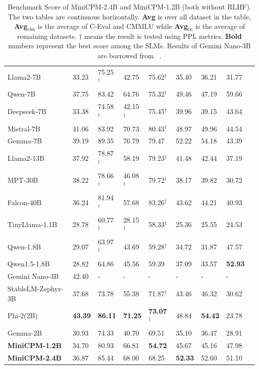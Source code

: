 \documentclass[dvipsnames]{article}
\begin{document}
\begin{table}[!htbp]
{\begin{tabular}{lm{1.2cm}m{1.2cm}m{1.2cm}m{1.7cm}m{1.2cm}m{1.2cm}m{1.2cm}m{1.2cm}}
\midrule
Llama2-7B  & 33.23 & 75.25$^{\dag}$ & 42.75 & 75.62$^{\dag}$ & 35.40 & 36.21 & 31.77 \\
Qwen-7B  & 37.75 & 83.42 & 64.76 & 75.32$^{\dag}$ & 49.46 & 47.19 & 59.66 \\
Deepseek-7B  & 33.38 & 74.58$^{\dag}$ & 42.15$^{\dag}$ & 75.45$^{\dag}$ & 39.96 & 39.15 & 43.64 \\
Mistral-7B & 41.06 & 83.92 & 70.73 & 80.43$^{\dag}$ & 48.97 & 49.96 & 44.54 \\
Gemma-7B  & 39.19 & 89.35 & 76.79 & 79.47 & 52.22 & 54.18 & 43.39 \\
\midrule
Llama2-13B & 37.92 & 78.87$^{\dag}$ & 58.19 & 79.23$^{\dag}$ & 41.48 & 42.44 & 37.19 \\
MPT-30B  & 38.22 & 78.66$^{\dag}$ & 46.08$^{\dag}$ & 79.72$^{\dag}$ & 38.17 & 39.82 & 30.72 \\
Falcon-40B & 36.24 & 81.94$^{\dag}$ & 57.68 & 83.26$^{\dag}$ & 43.62 & 44.21 & 40.93 \\
\midrule
TinyLlama-1.1B  & 28.78 & 60.77$^{\dag}$ & 28.15$^{\dag}$ & 58.33$^{\dag}$ & 25.36 & 25.55 & 24.53 \\
Qwen-1.8B  & 29.07 & 63.97$^{\dag}$ & 43.69 & 59.28$^{\dag}$ & 34.72 & 31.87 & 47.57 \\
Qwen1.5-1.8B  & 28.82 & 64.86 & 45.56 & 59.39 & 37.09 & 33.57 & \textbf{52.93} \\
Gemini Nano-3B & 42.40 & - & - & - & - & - & - \\
StableLM-Zephyr-3B  & 37.68 & 73.78 & 55.38 & 71.87$^{\dag}$ & 43.46 & 46.32 & 30.62 \\
Phi-2(2B)  & \textbf{43.39} & \textbf{86.11} & \textbf{71.25} & \textbf{73.07$^{\dag}$} & 48.84 & \textbf{54.42} & 23.78 \\
Gemma-2B  & 30.93 & 74.33 & 40.70 & 69.51 & 35.10 & 36.47 & 28.91\\
\midrule
\textbf{MiniCPM-1.2B}  & 34.70 & 80.93 & 66.81 &  \textbf{54.72} &  45.67 & 45.16 & 47.98 \\
\textbf{MiniCPM-2.4B}  & 36.87 & 85.44 & 68.00 & 68.25 & \textbf{52.33} & 52.60 & 51.10 \\
\bottomrule
\end{tabular}
}
\caption{Benchmark Score of MiniCPM-2.4B and MiniCPM-1.2B (both without RLHF). The two tables are continuous horizontally. \textbf{Avg} is over all dataset in the table, \textbf{Avg$_{\text{chn}}$} is the average of C-Eval and CMMLU while \textbf{Avg$_{\text{en}}$} is the average of remaining datasets. $\dag$ means the result is tested using PPL metrics. \textbf{Bold} numbers represent the best score among the SLMs. Results of Gemini Nano-3B are borrowed from ~\cite{team2023gemini}.}
\label{tab:benchmark}
\end{table}
\vspace{-5mm}
\end{document}
